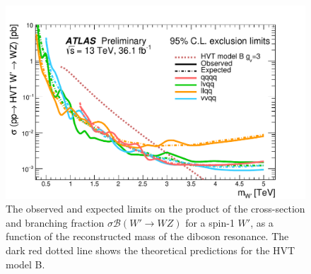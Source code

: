 \begin{figure}[!htb]
  \centering
    \includegraphics[width=.495\textwidth]{figures/ATLAS_Diboson_Summary.pdf}
  \caption{The observed and expected limits on the product of the cross-section and branching fraction $\sigma \mathcal{B} (W' \rightarrow WZ)$ for a spin-1 $W'$, as a function of the reconstructed mass of the diboson resonance. The dark red dotted line shows the theoretical predictions for the HVT model B.}
  \label{fig:theory_ATLAS_Diboson_Summary}
\end{figure}

